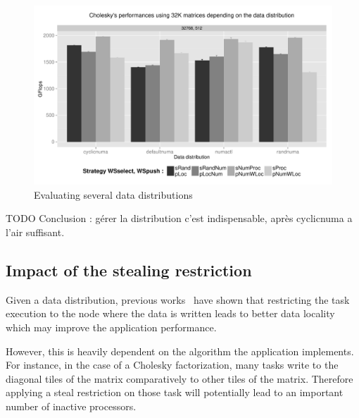 \documentclass{Styles/llncs}
\begin{document}
\begin{figure}[t]
  \centering
  \includegraphics[scale=0.5]{figures/graph_distrib.pdf}
\caption{Evaluating several data distributions}
\label{fig:eval-distrib}
\end{figure}


TODO Conclusion : gérer la distribution c'est indispensable, après cyclicnuma a l'air suffisant.


\subsection{Impact of the stealing restriction}

Given a data distribution, previous works~\cite{Olivier:2012:CMW:2388996.2389085}
have shown that restricting the task execution to the node where the data is
written leads to better data locality which may improve the application performance.

However, this is heavily dependent on the algorithm the application implements. For instance, in the case
of a Cholesky factorization, many tasks write to the diagonal tiles
of the matrix comparatively to other tiles of the matrix. Therefore applying
a steal restriction on those task will potentially lead to an important number
of inactive processors.
\end{document}
